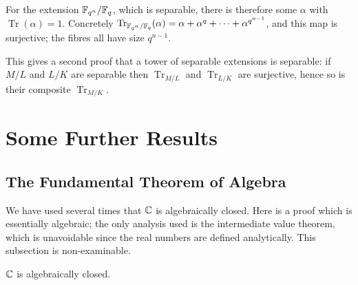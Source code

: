 \documentclass[a4paper]{scrartcl}
\newcommand{\Tr}{\operatorname{Tr}}
\begin{document}
\begin{example}
	For the extension $\mathbb{F}_{q^n}/\mathbb{F}_q$, which is separable, there is therefore some $\alpha$ with $\Tr(\alpha) = 1$. Concretely $\Tr_{\F_{q^n}/\F_q}(\alpha) = \alpha+\alpha^q+\dots+\alpha^{q^{n-1}}$, and this map is surjective; the fibres all have size $q^{n-1}$.
\end{example}

\begin{remark}
	This gives a second proof that a tower of separable extensions is separable: if $M/L$ and $L/K$ are separable then $\Tr_{M/L}$ and $\Tr_{L/K}$ are surjective, hence so is their composite $\Tr_{M/K}$.
\end{remark}

\section{Some Further Results}\label{sec:further}

\subsection{The Fundamental Theorem of Algebra}

We have used several times that $\mathbb{C}$ is algebraically closed. Here is a proof which is essentially algebraic; the only analysis used is the intermediate value theorem, which is unavoidable since the real numbers are defined analytically. This subsection is non-examinable.

\begin{theorem}
	$\mathbb{C}$ is algebraically closed.
\end{theorem}
\end{document}
